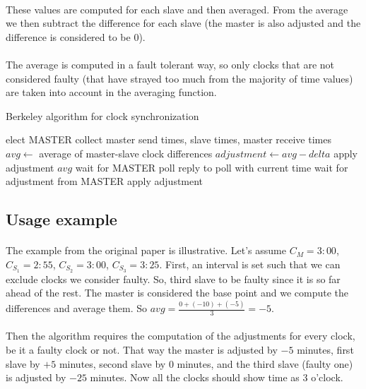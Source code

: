 \documentclass[12pt]{article}
\begin{document}
\paragraph{}
These values are computed for each slave and then averaged. From the average we then subtract the difference for each slave (the master is also adjusted and the difference is considered to be 0).

\paragraph{}
The average is computed in a fault tolerant way, so only clocks that are not considered faulty (that have strayed too much from the majority of time values) are taken into account in the averaging function.

\begin{algorithm}
\caption{Berkeley algorithm for clock synchronization}
\begin{algorithmic}[1]
	\State elect MASTER
		\State collect master send times, slave times, master receive times
		\State $avg \gets $ average of master-slave clock differences
		\State $adjustment \gets avg-delta$
		\State apply adjustment $avg$
		\State wait for MASTER poll
		\State reply to poll with current time
		\State wait for adjustment from MASTER
		\State apply adjustment
	\EndIf
\end{algorithmic}
\end{algorithm}

\subsection{Usage example}
\paragraph{}
The example from the original paper is illustrative. Let's assume $C_{M} = 3:00$, $C_{S_{1}} = 2:55$, $C_{S_{2}} = 3:00$, $C_{S_{3}} = 3:25$. First, an interval is set such that we can exclude clocks we consider faulty. So, third slave to be faulty since it is so far ahead of the rest. The master is considered the base point and we compute the differences and average them. So $avg=\frac{0 + (-10) + (-5)}{3} = -5$. 

\paragraph{}
Then the algorithm requires the computation of the adjustments for every clock, be it a faulty clock or not. That way the master is adjusted by $-5$ minutes, first slave by $+5$ minutes, second slave by $0$ minutes, and the third slave (faulty one) is adjusted by $-25$ minutes. Now all the clocks should show time as 3 o'clock.
\end{document}
